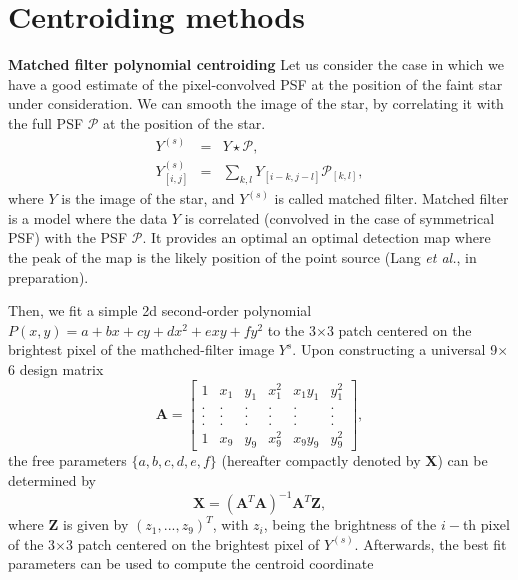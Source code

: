 \documentclass[12pt, preprint]{aastex}
\newcommand{\beq}{\begin{equation}}
\newcommand{\eeq}{\end{equation}}
\begin{document}
\section{Centroiding methods}\label{sec:method}
\begin{description}
\item{{\bf Matched filter polynomial centroiding}} \quad Let us consider the case 
in which we have a good estimate of the pixel-convolved PSF at
the position of the faint star under consideration. 
We can smooth the image of the star, by correlating it with the 
full PSF $\mathcal{P}$ at the position of the star.
\begin{eqnarray}
Y^{(s)} &=& Y \star \mathcal{P}, \\
Y^{(s)}_{[i,j]} &=& \sum_{k,l}Y_{[i-k,j-l]}\mathcal{P}_{[k,l]},
\end{eqnarray}
where $Y$ is the image of the star, and $Y^{(s)}$ is called matched filter. 
Matched filter is a model where the data $Y$ is correlated (convolved in the 
case of symmetrical PSF) with the PSF $\mathcal{P}$. It provides an optimal an 
optimal detection map where the peak of the map is the likely position of the 
point source (Lang \emph{et al.}, in preparation).

Then, we fit a simple 2d second-order polynomial 
$P(x,y)=a+bx+cy+dx^2+exy+fy^2$ 
to the 3$\times$3 patch centered on the brightest pixel of the
mathched-filter image $Y^{s}$.
Upon constructing a universal 9$\times$6 design matrix
\begin{equation}
    \mathbf{A} = 
    \begin{bmatrix}
        1 & x_{1} & y_{1} & x_{1}^{2} & x_{1}y_{1} & y_{1}^{2} \\
        . & . & . & . & . & .  \\
        . & . & . & . & . & .  \\
        . & . & . & . & . & .  \\
        1 & x_{9} & y_{9} & x_{9}^{2} & x_{9}y_{9} & y_{9}^{2}
    \end{bmatrix},
\end{equation}
the free parameters $\{a,b,c,d,e,f\}$
(hereafter compactly denoted by $\mathbf{X}$) can be determined by 
\beq
\mathbf{X} = (\mathbf{A}^{T}\mathbf{A})^{-1}\mathbf{A}^{T}\mathbf{Z},
\label{linearfit}
\eeq
where $\mathbf{Z}$ is given by $(z_{1},...,z_{9})^{T}$,
with $z_{i}$, being the brightness of the $i-$th pixel of the 3$\times$3 patch centered on the brightest pixel of $Y^{(s)}$.
Afterwards, the best fit parameters can be used to compute the centroid coordinate


\end{description}
\end{document}
